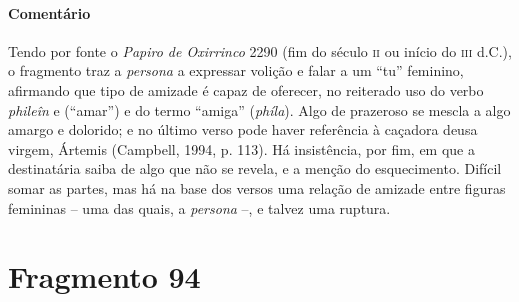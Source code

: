 {\paragraph{Comentário} Tendo por fonte o \textit{Papiro de Oxirrinco} 2290 (fim do século \textsc{ii} ou início do \textsc{iii} d.C.), o fragmento traz a \textit{persona} a expressar volição e falar a um ``tu'' feminino, afirmando que tipo de amizade é capaz de oferecer, no reiterado uso do verbo \textit{phileîn} e (``amar'') e do termo ``amiga'' (\textit{phíla}). Algo de prazeroso se mescla a algo amargo e dolorido; e no último verso pode haver 
referência à caçadora deusa virgem, Ártemis (Campbell, 1994, p. 113). Há insistência, por fim, em que a destinatária saiba de algo que não se revela, e a menção do esquecimento. Difícil somar as partes, mas há na base dos versos  uma relação de amizade entre figuras femininas -- uma das quais, a \textit{persona} --, e talvez uma ruptura.}




\pagebreak
\section{Fragmento 94}

